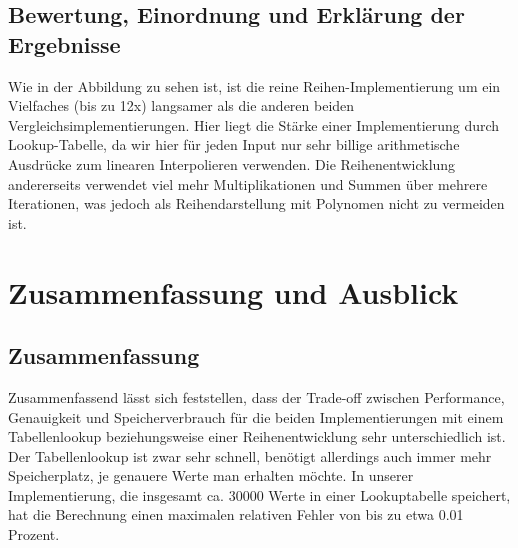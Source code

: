 \documentclass[course=erap] {aspdoc}
\begin{document}
 
     \subsection{Bewertung, Einordnung und Erklärung der Ergebnisse}
     Wie in der Abbildung zu sehen ist, ist die reine Reihen-Implementierung um ein Vielfaches (bis zu 12x) langsamer als die anderen
     beiden Vergleichsimplementierungen.
     Hier liegt die Stärke einer Implementierung durch Lookup-Tabelle, da wir hier für jeden
     Input nur sehr billige arithmetische Ausdrücke zum linearen Interpolieren verwenden.
     Die Reihenentwicklung andererseits verwendet viel mehr Multiplikationen und Summen über mehrere Iterationen, was jedoch als Reihendarstellung mit Polynomen nicht zu vermeiden ist.
     
 
     \section{Zusammenfassung und Ausblick}
     \subsection{Zusammenfassung}
     Zusammenfassend lässt sich feststellen, dass der Trade-off zwischen Performance, Genauigkeit und Speicherverbrauch für die beiden Implementierungen mit einem Tabellenlookup beziehungsweise einer Reihenentwicklung sehr unterschiedlich ist.
     Der Tabellenlookup ist zwar sehr schnell, benötigt allerdings auch immer mehr Speicherplatz, je genauere Werte man erhalten möchte.
     In unserer Implementierung, die insgesamt ca. 30000 Werte in einer Lookuptabelle speichert, hat die Berechnung einen maximalen relativen Fehler von bis zu etwa 0.01 Prozent.
 
\end{document}
